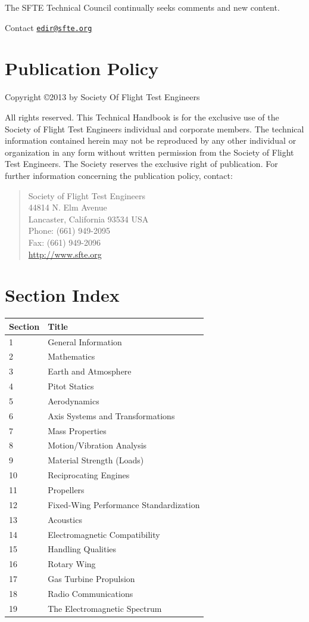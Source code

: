 \documentclass[
]{book}
\begin{document}
The SFTE Technical Council continually seeks comments and new content.

Contact \href{mailto:edir@sfte.org}{\nolinkurl{edir@sfte.org}}

\hypertarget{publication-policy}{%
\section*{Publication Policy}\label{publication-policy}}

Copyright ©2013 by Society Of Flight Test Engineers

All rights reserved. This Technical Handbook is for the exclusive use of the Society of Flight Test Engineers individual and corporate members. The technical information contained herein may not be reproduced by any other individual or organization in any form without written permission from the Society of Flight Test Engineers. The Society reserves the exclusive right of publication. For further information concerning the publication policy, contact:

\begin{quote}
Society of Flight Test Engineers\\
44814 N. Elm Avenue\\
Lancaster, California 93534 USA\\
Phone: (661) 949-2095\\
Fax: (661) 949-2096\\
\url{http://www.sfte.org}
\end{quote}

\hypertarget{section-index}{%
\section*{Section Index}\label{section-index}}

\begin{longtable}[]{@{}ll@{}}
\toprule
Section & Title\tabularnewline
\midrule
\endhead
1 & General Information\tabularnewline
2 & Mathematics\tabularnewline
3 & Earth and Atmosphere\tabularnewline
4 & Pitot Statics\tabularnewline
5 & Aerodynamics\tabularnewline
6 & Axis Systems and Transformations\tabularnewline
7 & Mass Properties\tabularnewline
8 & Motion/Vibration Analysis\tabularnewline
9 & Material Strength (Loads)\tabularnewline
10 & Reciprocating Engines\tabularnewline
11 & Propellers\tabularnewline
12 & Fixed-Wing Performance Standardization\tabularnewline
13 & Acoustics\tabularnewline
14 & Electromagnetic Compatibility\tabularnewline
15 & Handling Qualities\tabularnewline
16 & Rotary Wing\tabularnewline
17 & Gas Turbine Propulsion\tabularnewline
18 & Radio Communications\tabularnewline
19 & The Electromagnetic Spectrum\tabularnewline
\bottomrule
\end{longtable}
\end{document}
